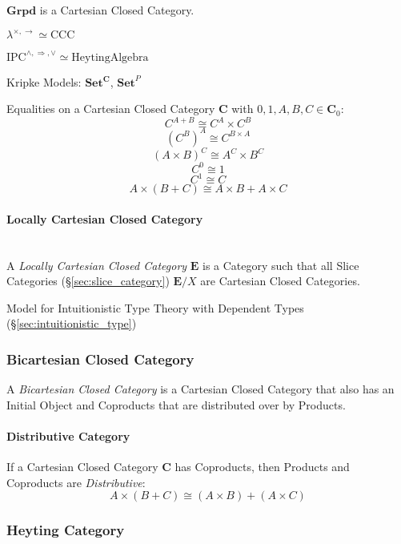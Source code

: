 $\mathbf{Grpd}$ is a Cartesian Closed Category.

$\lambda^{\times, \rightarrow} \simeq \mathrm{CCC}$

$\mathrm{IPC}^{\wedge, \Rightarrow, \vee} \simeq \mathrm{Heyting Algebra}$

Kripke Models: $\mathbf{Set^C}$, $\mathbf{Set}^P$ %

Equalities on a Cartesian Closed Category $\mathbf{C}$ with
$0,1,A,B,C \in \mathbf{C}_0$:
\[
  C^{A + B} \cong C^A \times C^B
\]\[
  (C^B)^A \cong C^{B \times A}
\]\[
  (A \times B)^C \cong A^C \times B^C
\]\[
  C^0 \cong 1
\]\[
  C^1 \cong C
\]\[
  A \times (B + C) \cong A \times B + A \times C
\]



\paragraph{Locally Cartesian Closed Category}
\label{sec:locally_cartesian}
\hfill \\
A \emph{Locally Cartesian Closed Category} $\mathbf{E}$ is a Category
such that all Slice Categories (\S\ref{sec:slice_category})
$\mathbf{E}/X$ are Cartesian Closed Categories.

Model for Intuitionistic Type Theory with Dependent Types
(\S\ref{sec:intuitionistic_type})



\subsubsection{Bicartesian Closed Category}\label{sec:bicartesian}

A \emph{Bicartesian Closed Category} is a Cartesian Closed Category
that also has an Initial Object and Coproducts that are distributed
over by Products.



\paragraph{Distributive Category}\label{sec:distributive_category}

If a Cartesian Closed Category $\mathbf{C}$ has Coproducts, then
Products and Coproducts are \emph{Distributive}:\cite{awodey06}
\[
  A \times (B + C) \cong (A \times B) + (A \times C)
\]



\subsubsection{Heyting Category}\label{sec:heyting_category}

